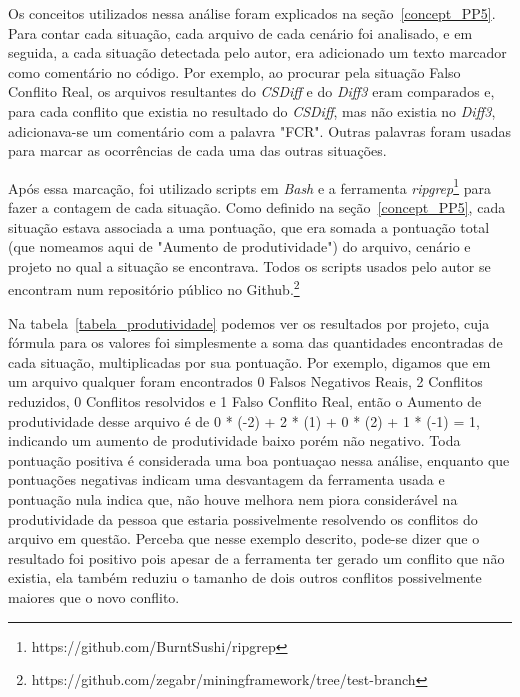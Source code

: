 Os conceitos utilizados nessa análise foram explicados na seção~\ref{concept_PP5}. Para contar cada situação, cada arquivo de cada
cenário foi analisado, e em seguida, a cada situação detectada pelo autor, era adicionado um texto marcador como comentário
no código. Por exemplo, ao procurar pela situação Falso Conflito Real, os arquivos resultantes do \emph{CSDiff} e do \emph{Diff3} eram comparados
e, para cada conflito que existia no resultado do \emph{CSDiff}, mas não existia no \emph{Diff3}, adicionava-se um comentário com a palavra "FCR".
Outras palavras foram usadas para marcar as ocorrências de cada uma das outras situações.

Após essa marcação, foi utilizado scripts em \emph{Bash} e a ferramenta \emph{ripgrep}\footnote{https://github.com/BurntSushi/ripgrep}
para fazer a contagem de cada situação. Como definido
na seção~\ref{concept_PP5}, cada situação estava associada a uma pontuação, que era somada
a pontuação total (que nomeamos aqui de "Aumento de produtividade") do arquivo, cenário e projeto no qual a situação
se encontrava. Todos os scripts usados pelo autor se encontram num repositório público no Github.\footnote{https://github.com/zegabr/miningframework/tree/test-branch} %

Na tabela~\ref{tabela_produtividade} podemos ver os resultados por projeto, cuja fórmula para os valores foi simplesmente a soma
das quantidades encontradas de cada situação, multiplicadas por sua pontuação. Por exemplo, digamos que em um arquivo qualquer
foram encontrados 0 Falsos Negativos Reais, 2 Conflitos reduzidos, 0 Conflitos resolvidos e 1 Falso Conflito Real, então o
Aumento de produtividade desse arquivo é de 0 * (-2) + 2 * (1) + 0 * (2) + 1 * (-1) = 1, indicando um aumento de
produtividade baixo porém não negativo. Toda pontuação positiva é considerada uma boa pontuaçao nessa análise, enquanto que
pontuações negativas indicam uma desvantagem da ferramenta usada e pontuação nula indica que, não houve melhora nem piora
considerável na produtividade da pessoa que estaria possivelmente resolvendo os conflitos do arquivo em questão.
Perceba que nesse exemplo descrito, pode-se dizer que o resultado foi positivo pois apesar de a ferramenta ter gerado um
conflito que não existia, ela também reduziu o tamanho de dois outros conflitos possivelmente maiores que o novo conflito.

